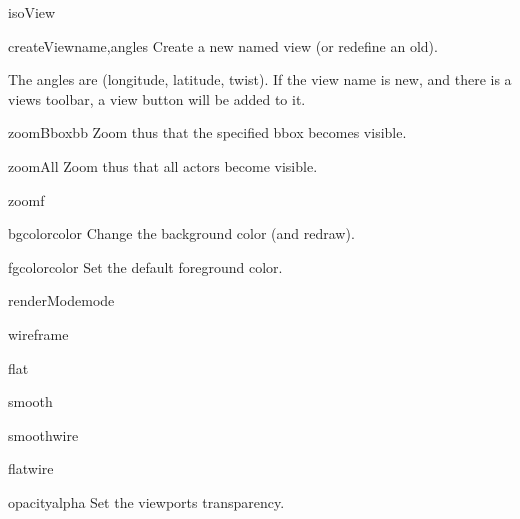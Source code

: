 \begin{funcdesc}{isoView}{}
\end{funcdesc}

\begin{funcdesc}{createView}{name,angles}
Create a new named view (or redefine an old).

The angles are (longitude, latitude, twist).
If the view name is new, and there is a views toolbar,
a view button will be added to it.

\end{funcdesc}

\begin{funcdesc}{zoomBbox}{bb}
Zoom thus that the specified bbox becomes visible.
\end{funcdesc}

\begin{funcdesc}{zoomAll}{}
Zoom thus that all actors become visible.
\end{funcdesc}

\begin{funcdesc}{zoom}{f}
\end{funcdesc}

\begin{funcdesc}{bgcolor}{color}
Change the background color (and redraw).
\end{funcdesc}

\begin{funcdesc}{fgcolor}{color}
Set the default foreground color.
\end{funcdesc}

\begin{funcdesc}{renderMode}{mode}
\end{funcdesc}

\begin{funcdesc}{wireframe}{}
\end{funcdesc}

\begin{funcdesc}{flat}{}
\end{funcdesc}

\begin{funcdesc}{smooth}{}
\end{funcdesc}

\begin{funcdesc}{smoothwire}{}
\end{funcdesc}

\begin{funcdesc}{flatwire}{}
\end{funcdesc}

\begin{funcdesc}{opacity}{alpha}
Set the viewports transparency.
\end{funcdesc}

